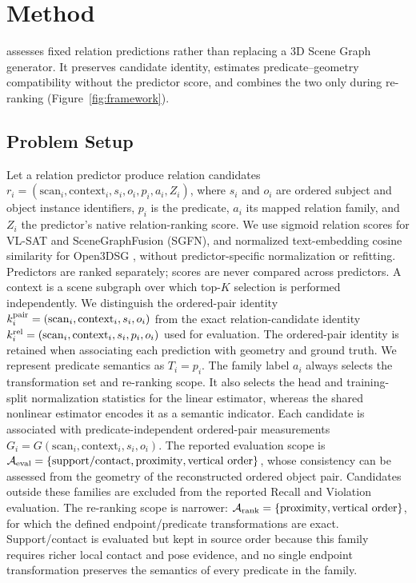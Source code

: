 \section{Method}

\method{} assesses fixed relation predictions rather than replacing a 3D Scene
Graph generator. It preserves candidate identity, estimates predicate--geometry
compatibility without the predictor score, and combines the two only
during re-ranking (Figure~\ref{fig:framework}).

\subsection{Problem Setup}

Let a relation predictor produce relation candidates
$r_i=(\mathrm{scan}_i,\mathrm{context}_i,s_i,o_i,p_i,a_i,Z_i)$, where $s_i$
and $o_i$ are ordered subject and object instance identifiers,
$p_i$ is the predicate, $a_i$ its mapped relation family, and $Z_i$ the
predictor's native relation-ranking score. We use sigmoid relation scores for
VL-SAT and SceneGraphFusion (SGFN), and normalized text-embedding cosine
similarity for Open3DSG
\cite{wang2023vlsat,wu2021scenegraphfusion,koch2024open3dsg},
without predictor-specific normalization or refitting. Predictors are ranked
separately; scores are never compared across predictors. A context is a scene subgraph over
which top-$K$ selection is performed independently.
We distinguish the ordered-pair identity
$k_i^{\rm pair}=(\mathrm{scan}_i,\mathrm{context}_i,s_i,o_i)$ from the exact
relation-candidate identity
$k_i^{\rm rel}=(\mathrm{scan}_i,\mathrm{context}_i,s_i,p_i,o_i)$ used for
evaluation. The ordered-pair identity is retained when associating each
prediction with geometry and ground truth. We represent predicate semantics as
$T_i=p_i$. The family label $a_i$ always selects the transformation set and
re-ranking scope. It also selects the head and training-split normalization
statistics for the linear estimator, whereas the shared nonlinear estimator
encodes it as a semantic indicator. Each candidate is associated with
predicate-independent ordered-pair measurements
$G_i=G(\mathrm{scan}_i,\mathrm{context}_i,s_i,o_i)$. The reported evaluation
scope is $\mathcal{A}_{\rm eval}=\{\mathrm{support/contact},\mathrm{proximity},
\mathrm{vertical\ order}\}$, whose consistency can be assessed from the
geometry of the reconstructed ordered object pair. Candidates outside these
families are excluded from the reported Recall and Violation evaluation.
The re-ranking scope is narrower:
    $\mathcal A_{\rm rank}=\{\mathrm{proximity},\mathrm{vertical\ order}\}$,
    for which the defined endpoint/predicate transformations are exact.
Support/contact is evaluated but kept in source order because this family
requires richer local contact and pose evidence, and no single endpoint
transformation preserves the semantics of every predicate in the family.

